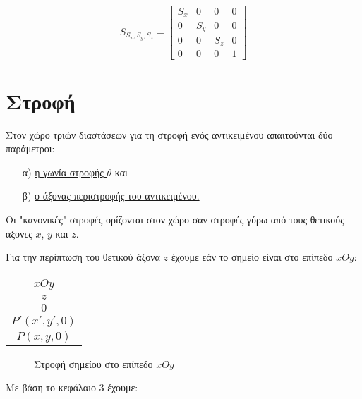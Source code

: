 
\[
S_{S_x, S_y, S_z} = 
\begin{bmatrix}
S_x & 0 & 0 & 0 \\
0 & S_y & 0 & 0 \\
0 & 0 & S_z & 0 \\
0 & 0 & 0 & 1
\end{bmatrix}
\]


\section{Στροφή}

Στον χώρο τριών διαστάσεων για τη στροφή ενός αντικειμένου απαιτούνται δύο παράμετροι:

\begin{enumerate}
    \item[α)] \underline{η γωνία στροφής $\theta$} και
    \item[β)] \underline{ο άξονας περιστροφής του αντικειμένου.}
\end{enumerate}

Οι "κανονικές" στροφές ορίζονται στον χώρο σαν στροφές γύρω από τους θετικούς άξονες $x$, $y$ και $z$.

Για την περίπτωση του θετικού άξονα $z$ έχουμε εάν το σημείο είναι στο επίπεδο $xOy$:

\begin{center}
\begin{tabular}{c}
$xOy$ \\
\hline
$z$ \\
$0$ \\
$P' (x', y', 0)$ \\
$P (x, y, 0)$ \\
\end{tabular}
\end{center}

\begin{figure}[h]
\centering
\caption{Στροφή σημείου στο επίπεδο $xOy$}
\end{figure}

Με βάση το κεφάλαιο 3 έχουμε:

